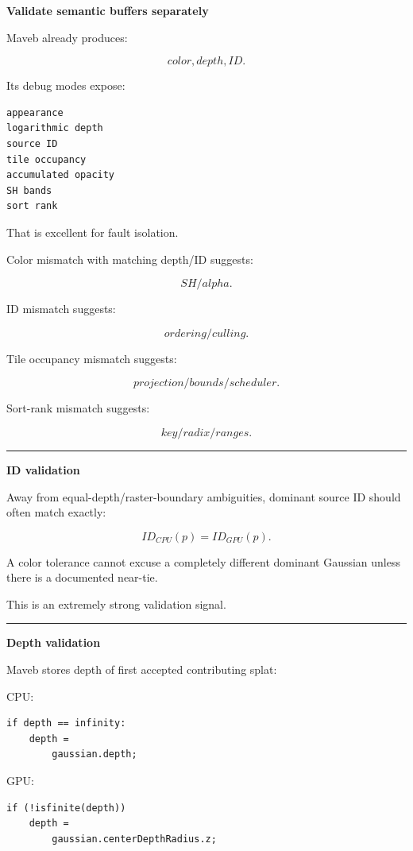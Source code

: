 \textbf{Validate semantic buffers separately}

Maveb already produces:

\[
color,
depth,
ID.
\]

Its debug modes expose:

\protect{}\label{zp6hzo}%
\begin{verbatim}
appearance
logarithmic depth
source ID
tile occupancy
accumulated opacity
SH bands
sort rank
\end{verbatim}

That is excellent for fault isolation.

Color mismatch with matching depth/ID suggests:

\[
SH/alpha.
\]

ID mismatch suggests:

\[
ordering/culling.
\]

Tile occupancy mismatch suggests:

\[
projection/bounds/scheduler.
\]

Sort-rank mismatch suggests:

\[
key/radix/ranges.
\]

\begin{center}\rule{0.5\linewidth}{0.5pt}\end{center}

\textbf{ID validation}

Away from equal-depth/raster-boundary ambiguities, dominant source ID should often match exactly:

\[
\boxed{
ID_{CPU}(p)=ID_{GPU}(p).
}
\]

A color tolerance cannot excuse a completely different dominant Gaussian unless there is a documented near-tie.

This is an extremely strong validation signal.

\begin{center}\rule{0.5\linewidth}{0.5pt}\end{center}

\textbf{Depth validation}

Maveb stores depth of first accepted contributing splat:

CPU:

\begin{verbatim}
if depth == infinity:
    depth =
        gaussian.depth;
\end{verbatim}

GPU:

\begin{verbatim}
if (!isfinite(depth))
    depth =
        gaussian.centerDepthRadius.z;
\end{verbatim}


